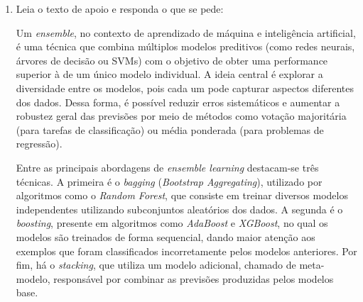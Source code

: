\documentclass[12pt,a4paper]{article}
\begin{document}
\begin{enumerate}
\begin{lstlisting}
package sistema.seguranca; 
public class Catraca {       
    protected int codigoAcesso; 
}
\end{lstlisting}

    \begin{enumerate}[label=\Alph*)]
        \item Somente classes filhas de \texttt{Catraca}, independentemente do pacote, sem acesso para outras classes do mesmo pacote.
        \item Classes que estejam no mesmo pacote (\texttt{sistema.seguranca}) de \texttt{Catraca} ou classes filhas (subclasses), mesmo que estejam em outros pacotes.
        \item Qualquer classe, em qualquer pacote, desde que devidamente instanciada na memória principal.
        \item Exclusivamente os métodos que pertencem internamente à declaração da classe \texttt{Catraca}.
        \item Apenas as classes filhas que estiverem rigorosamente contidas dentro do mesmo pacote (\texttt{sistema.seguranca}).
    \end{enumerate}

    \vspace{0.3cm}

\item Leia o texto de apoio e responda o que se pede:

Um \textit{ensemble}, no contexto de aprendizado de máquina e inteligência artificial, é uma técnica que combina múltiplos modelos preditivos (como redes neurais, árvores de decisão ou SVMs) com o objetivo de obter uma performance superior à de um único modelo individual. A ideia central é explorar a diversidade entre os modelos, pois cada um pode capturar aspectos diferentes dos dados. Dessa forma, é possível reduzir erros sistemáticos e aumentar a robustez geral das previsões por meio de métodos como votação majoritária (para tarefas de classificação) ou média ponderada (para problemas de regressão).

Entre as principais abordagens de \textit{ensemble learning} destacam-se três técnicas. A primeira é o \textit{bagging} (\textit{Bootstrap Aggregating}), utilizado por algoritmos como o \textit{Random Forest}, que consiste em treinar diversos modelos independentes utilizando subconjuntos aleatórios dos dados. A segunda é o \textit{boosting}, presente em algoritmos como \textit{AdaBoost} e \textit{XGBoost}, no qual os modelos são treinados de forma sequencial, dando maior atenção aos exemplos que foram classificados incorretamente pelos modelos anteriores. Por fim, há o \textit{stacking}, que utiliza um modelo adicional, chamado de meta-modelo, responsável por combinar as previsões produzidas pelos modelos base.


\end{enumerate}
\end{document}
